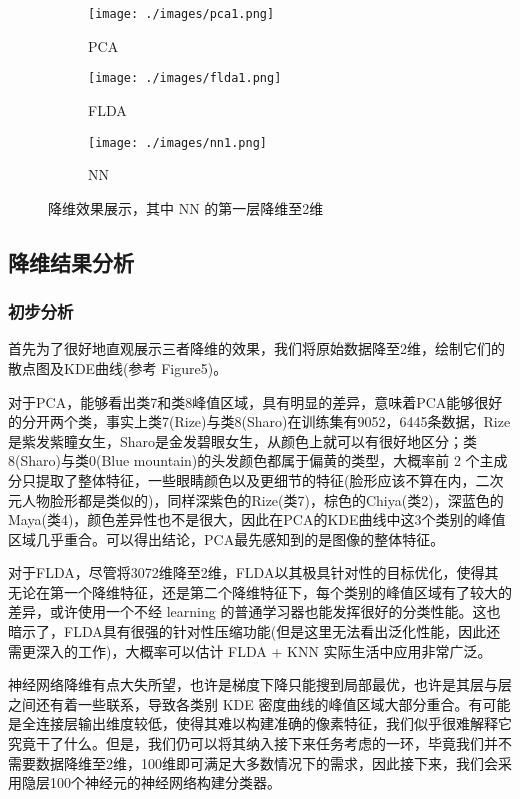 \documentclass[fleqn]{Paquetes/RevDigMatEduInt}
\begin{document}
\begin{figure*}
	\centering
	\begin{subfigure}{0.315\textwidth}
		\texttt{[image: ./images/pca1.png]}
		\caption{PCA}
	\end{subfigure}
	\begin{subfigure}{0.315\textwidth}
		\texttt{[image: ./images/flda1.png]}
		\caption{FLDA}
	\end{subfigure}
	\begin{subfigure}{0.315\textwidth}
		\texttt{[image: ./images/nn1.png]}
		\caption{NN}
	\end{subfigure}
	\caption{降维效果展示，其中 NN 的第一层降维至2维}
\end{figure*}
\subsection{降维结果分析}

\subsubsection{初步分析}

首先为了很好地直观展示三者降维的效果，我们将原始数据降至2维，绘制它们的散点图及KDE曲线(参考 Figure5)。

对于PCA，能够看出类7和类8峰值区域，具有明显的差异，意味着PCA能够很好的分开两个类，事实上类7(Rize)与类8(Sharo)在训练集有9052，6445条数据，Rize是紫发紫瞳女生，Sharo是金发碧眼女生，从颜色上就可以有很好地区分；类8(Sharo)与类0(Blue mountain)的头发颜色都属于偏黄的类型，大概率前 2 个主成分只提取了整体特征，一些眼睛颜色以及更细节的特征(脸形应该不算在内，二次元人物脸形都是类似的)，同样深紫色的Rize(类7)，棕色的Chiya(类2)，深蓝色的Maya(类4)，颜色差异性也不是很大，因此在PCA的KDE曲线中这3个类别的峰值区域几乎重合。可以得出结论，PCA最先感知到的是图像的整体特征。

对于FLDA，尽管将3072维降至2维，FLDA以其极具针对性的目标优化，使得其无论在第一个降维特征，还是第二个降维特征下，每个类别的峰值区域有了较大的差异，或许使用一个不经 learning 的普通学习器也能发挥很好的分类性能。这也暗示了，FLDA具有很强的针对性压缩功能(但是这里无法看出泛化性能，因此还需更深入的工作)，大概率可以估计 FLDA + KNN 实际生活中应用非常广泛。

神经网络降维有点大失所望，也许是梯度下降只能搜到局部最优，也许是其层与层之间还有着一些联系，导致各类别 KDE 密度曲线的峰值区域大部分重合。有可能是全连接层输出维度较低，使得其难以构建准确的像素特征，我们似乎很难解释它究竟干了什么。但是，我们仍可以将其纳入接下来任务考虑的一环，毕竟我们并不需要数据降维至2维，100维即可满足大多数情况下的需求，因此接下来，我们会采用隐层100个神经元的神经网络构建分类器。
\end{document}
